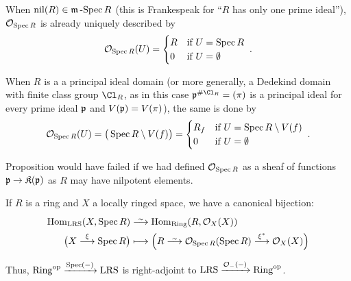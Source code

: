 \documentclass[a4paper,parskip=half,numbers=enddot, DIV=12]{scrreprt}
\begin{document}
\begin{example}
    \begin{alphanumerate}
        \item 
            When $\operatorname{nil}(R)\in \mathfrak{m}\operatorname{-Spec} R$ (this is Frankespeak for ``$R$ has only one prime ideal''), $\mathcal{O}_{\operatorname{Spec} R}$ is already uniquely described by 
            \begin{align*}
            	\mathcal{O}_{\operatorname{Spec} R} (U) = 
            	\begin{cases}
	            	R& \text{if }U=\operatorname{Spec} R\\
	            	0 & \text{if }U=\emptyset
            	\end{cases}\;.
            \end{align*}
        \item 
            When $R$ is a a principal ideal domain (or more generally, a Dedekind domain with finite class group $\Cl_R$, as in this case $\pp^{\#\Cl_R}=(\pi)$ is a principal ideal for every prime ideal $\mathfrak{p}$ and $V(\mathfrak{p})=V(\pi)$), the same is done by 
            \begin{align*}
            	\mathcal{O}_{\operatorname{Spec} R}(U)= \big(\operatorname{Spec} R\setminus V(f)\big) =
            	\begin{cases}
	            	R_f&\text{if }U=\operatorname{Spec} R\setminus V(f)\\
	            	0 &\text{if }U=\emptyset
            	\end{cases} \;.
            \end{align*}
    \end{alphanumerate}
\end{example}
\begin{rem}
    Proposition  would have failed if we had defined $\mathcal{O}_{\operatorname{Spec} R}$ as a sheaf of functions $\pp\morphism \KK(\pp)$ as $R$ may have nilpotent elements.
\end{rem}
\begin{prop}
    If $R$ is a ring and $X$ a locally ringed space, we have a canonical bijection:
    \begin{align*}
        \Hom_{\cat{LRS}}(X,\Spec R) &\isomorphism \Hom_{\cat{Ring}}(R,\Oo_X(X))\\
        \big(X\morphism[\xi] \Spec R\big) &\longmapsto \Big(R\isomorphism \Oo_{\Spec R}(\Spec R) \morphism[\xi^*] \Oo_X(X)\Big)
    \end{align*}
\end{prop}
\begin{rem*}
    Thus, $\operatorname{Ring}^{\mathrm{op}} \xrightarrow{\operatorname{Spec}(-)} \operatorname{LRS}$ is right-adjoint to $\operatorname{LRS} \xrightarrow{\mathcal{O}_-(-)} \operatorname{Ring}^{\mathrm{op}}$.
\end{rem*}
\end{document}
